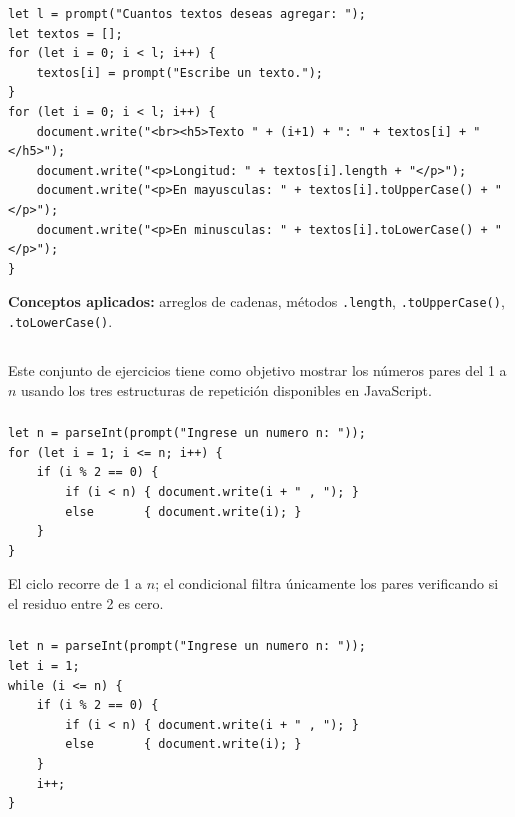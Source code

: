 \documentclass[10pt,a4paper]{article}
\begin{document}
\begin{lstlisting}[style=jsStyle, caption={Ejercicio 8 -- Manipulación de cadenas}]
let l = prompt("Cuantos textos deseas agregar: ");
let textos = [];
for (let i = 0; i < l; i++) {
    textos[i] = prompt("Escribe un texto.");
}
for (let i = 0; i < l; i++) {
    document.write("<br><h5>Texto " + (i+1) + ": " + textos[i] + "</h5>");
    document.write("<p>Longitud: " + textos[i].length + "</p>");
    document.write("<p>En mayusculas: " + textos[i].toUpperCase() + "</p>");
    document.write("<p>En minusculas: " + textos[i].toLowerCase() + "</p>");
}
\end{lstlisting}

\textbf{Conceptos aplicados:} arreglos de cadenas, métodos \texttt{.length}, \texttt{.toUpperCase()}, \texttt{.toLowerCase()}.

\subsection{\color{colorESCOM}{Grupo: Pares}}

Este conjunto de ejercicios tiene como objetivo mostrar los números pares del 1 a $n$ usando los tres estructuras de repetición disponibles en JavaScript.

\subsubsection{}

\begin{lstlisting}[style=jsStyle, caption={Pares con for}]
let n = parseInt(prompt("Ingrese un numero n: "));
for (let i = 1; i <= n; i++) {
    if (i % 2 == 0) {
        if (i < n) { document.write(i + " , "); }
        else       { document.write(i); }
    }
}
\end{lstlisting}

El ciclo recorre de 1 a $n$; el condicional filtra únicamente los pares verificando si el residuo entre 2 es cero.

\subsubsection{}

\begin{lstlisting}[style=jsStyle, caption={Pares con while}]
let n = parseInt(prompt("Ingrese un numero n: "));
let i = 1;
while (i <= n) {
    if (i % 2 == 0) {
        if (i < n) { document.write(i + " , "); }
        else       { document.write(i); }
    }
    i++;
}
\end{lstlisting}
\end{document}
